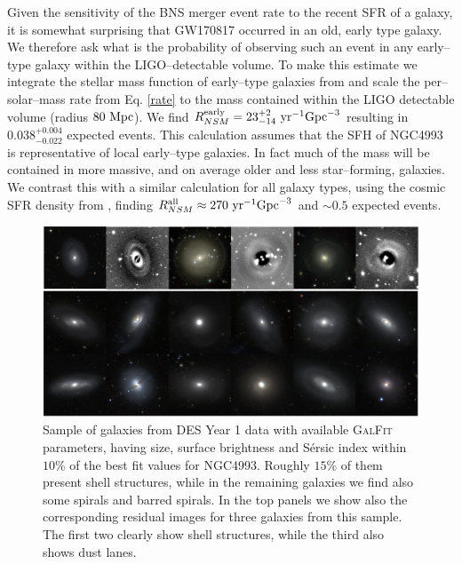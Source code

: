 Given the sensitivity of the BNS merger event rate to the recent SFR of a galaxy, it is somewhat surprising that GW170817 occurred in an old, early type galaxy. We therefore ask what is the probability of observing such an event in any early--type galaxy within the LIGO--detectable volume. To make this estimate we integrate the stellar mass function of early--type galaxies from \citet{weigel} and scale the per--solar--mass rate from Eq. \ref{rate} to the mass contained within the LIGO detectable volume (radius $80~{\rm Mpc}$). We find $R_{NSM}^{\rm early}= 23^{+2}_{-14} ~{\rm yr}^{-1} {\rm Gpc}^{-3}$ resulting in $0.038^{+0.004}_{-0.022}$ expected events. This calculation assumes that the SFH of NGC4993 is representative of local early--type galaxies. In fact much of the mass will be contained in more massive, and on average older and less star--forming, galaxies. We contrast this with a similar calculation for all galaxy types, using the cosmic SFR density from \citet{lognorm}, finding $R_{NSM}^{\rm all}\approx 270 ~{\rm yr}^{-1} {\rm Gpc}^{-3}$ and $\sim 0.5$ expected events.

\begin{figure}
\centering
\includegraphics[width=1.\textwidth]{./chapters/chapter3/Figures/Y1SampleLight.jpg}
\caption{Sample of galaxies from DES Year 1 data with available \textsc{GalFit} parameters, having size, surface brightness and S\'ersic index within $10\%$ of the best fit values for NGC4993. Roughly $15\%$ of them present shell structures, while in the remaining galaxies we find also some spirals and barred spirals. In the top panels we show also the corresponding residual images for three galaxies from this sample. The first two clearly show shell structures, while the third also shows dust lanes. }\label{fig:shelly1}\end{figure}


